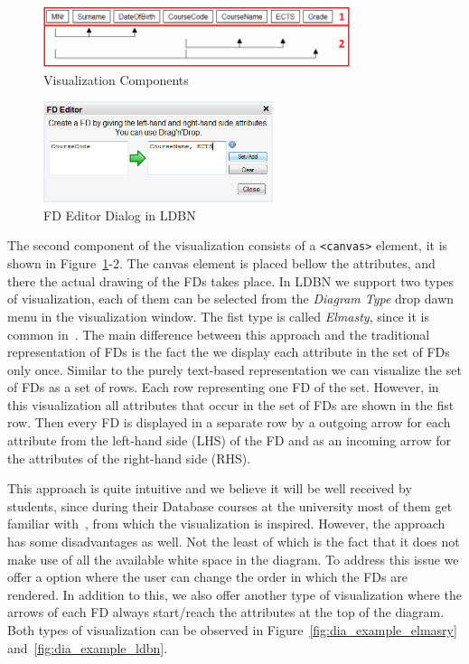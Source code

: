 \begin{figure}[h]
	\begin{center}
		\includegraphics[width=0.8\textwidth]{./img/impl-fds01.png}
		\caption{Visualization Components}
		\label{fig:impl-fds01}
	\end{center}
\end{figure}

\begin{figure}[h]
	\begin{center}
		\includegraphics[width=0.6\textwidth]{./img/fdeditor.png}
		\caption{FD Editor Dialog in LDBN}
		\label{fig:fdeditor}
	\end{center}
\end{figure}

The second component of the visualization consists of a \verb=<canvas>= element, it is shown in Figure~\ref{fig:impl-fds01}-2.
The canvas element is placed bellow the attributes, and there the actual drawing 
of the FDs takes place. In LDBN we support two types of visualization, each of them can be selected
from the \emph{Diagram Type} drop dawn menu in the visualization window. The fist type is called 
\emph{Elmasty}, since it is common in~\cite{bdb1}. The main difference between this approach and
the traditional representation of FDs is the fact the we display each attribute in the set of 
FDs only once. 
Similar to the purely text-based representation we can visualize the set
of FDs as a set of rows. Each row representing one FD of the set. 
However, in this visualization all attributes that occur in the set of FDs
are shown in the fist row. Then every FD is displayed in a separate row by a outgoing 
arrow for each attribute from the left-hand side (LHS) of the FD 
and as an incoming arrow for the attributes of the right-hand side (RHS).

This approach is quite intuitive and we believe it will be well received by
students, since during their Database courses at the university most of 
them get familiar with~\cite{bdb1}, from which
the visualization is inspired. However, the approach has some disadvantages
as well. Not the least of which is the fact that it does not make use
of all the available white space in the diagram. To address this issue
we offer a option where the user can change the order in which
the FDs are rendered. In addition to this, we also offer another type of
visualization where the arrows of each FD always start/reach the 
attributes at the top of the diagram. 
Both types of visualization can be observed in 
Figure~\ref{fig:dia_example_elmasry} and~\ref{fig:dia_example_ldbn}.

